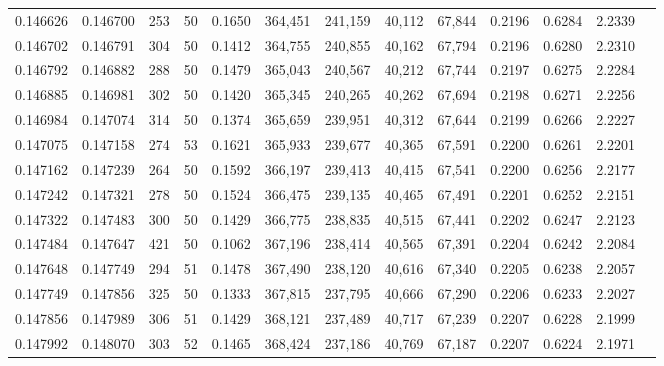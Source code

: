 \begin{tabular}{rrrrrrrrrrrrr}
0.146626 & 0.146700 &   253 &  50 &                                     0.1650 & 364,451 & 241,159 &  40,112 &  67,844 & 0.2196 & 0.6284 & 2.2339 \\
0.146702 & 0.146791 &   304 &  50 &                                     0.1412 & 364,755 & 240,855 &  40,162 &  67,794 & 0.2196 & 0.6280 & 2.2310 \\
0.146792 & 0.146882 &   288 &  50 &                                     0.1479 & 365,043 & 240,567 &  40,212 &  67,744 & 0.2197 & 0.6275 & 2.2284 \\
0.146885 & 0.146981 &   302 &  50 &                                     0.1420 & 365,345 & 240,265 &  40,262 &  67,694 & 0.2198 & 0.6271 & 2.2256 \\
0.146984 & 0.147074 &   314 &  50 &                                     0.1374 & 365,659 & 239,951 &  40,312 &  67,644 & 0.2199 & 0.6266 & 2.2227 \\
0.147075 & 0.147158 &   274 &  53 &                                     0.1621 & 365,933 & 239,677 &  40,365 &  67,591 & 0.2200 & 0.6261 & 2.2201 \\
0.147162 & 0.147239 &   264 &  50 &                                     0.1592 & 366,197 & 239,413 &  40,415 &  67,541 & 0.2200 & 0.6256 & 2.2177 \\
0.147242 & 0.147321 &   278 &  50 &                                     0.1524 & 366,475 & 239,135 &  40,465 &  67,491 & 0.2201 & 0.6252 & 2.2151 \\
0.147322 & 0.147483 &   300 &  50 &                                     0.1429 & 366,775 & 238,835 &  40,515 &  67,441 & 0.2202 & 0.6247 & 2.2123 \\
0.147484 & 0.147647 &   421 &  50 &                                     0.1062 & 367,196 & 238,414 &  40,565 &  67,391 & 0.2204 & 0.6242 & 2.2084 \\
0.147648 & 0.147749 &   294 &  51 &                                     0.1478 & 367,490 & 238,120 &  40,616 &  67,340 & 0.2205 & 0.6238 & 2.2057 \\
0.147749 & 0.147856 &   325 &  50 &                                     0.1333 & 367,815 & 237,795 &  40,666 &  67,290 & 0.2206 & 0.6233 & 2.2027 \\
0.147856 & 0.147989 &   306 &  51 &                                     0.1429 & 368,121 & 237,489 &  40,717 &  67,239 & 0.2207 & 0.6228 & 2.1999 \\
0.147992 & 0.148070 &   303 &  52 &                                     0.1465 & 368,424 & 237,186 &  40,769 &  67,187 & 0.2207 & 0.6224 & 2.1971 \\

\end{tabular}
